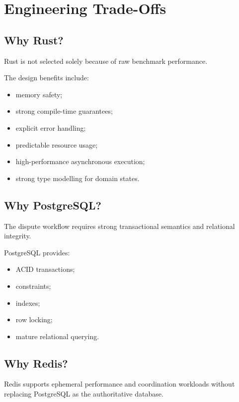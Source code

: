 \documentclass[11pt,a4paper]{article}
\begin{document}
\section{Engineering Trade-Offs}

\subsection{Why Rust?}

Rust is not selected solely because of raw benchmark performance.

The design benefits include:

\begin{itemize}
    \item memory safety;
    \item strong compile-time guarantees;
    \item explicit error handling;
    \item predictable resource usage;
    \item high-performance asynchronous execution;
    \item strong type modelling for domain states.
\end{itemize}

\subsection{Why PostgreSQL?}

The dispute workflow requires strong transactional semantics and
relational integrity.

PostgreSQL provides:

\begin{itemize}
    \item ACID transactions;
    \item constraints;
    \item indexes;
    \item row locking;
    \item mature relational querying.
\end{itemize}

\subsection{Why Redis?}

Redis supports ephemeral performance and coordination workloads without
replacing PostgreSQL as the authoritative database.
\end{document}
